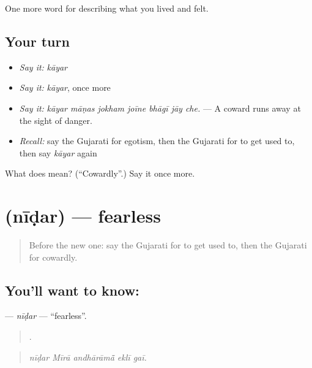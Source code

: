 \begin{grammarlens}[title={What you've built}]
One more word for describing what you lived and felt.
\end{grammarlens}

\subsection*{Your turn}
\begin{itemize}
\raggedright
  \item \emph{Say it:} \emph{kāyar}
  \item \emph{Say it:} \emph{kāyar}, once more
  \item \emph{Say it:} \emph{kāyar māṇas jokham joīne bhāgī jāy che.} — A coward runs away at the sight of danger.
  \item \emph{Recall:} say the Gujarati for egotism, then the Gujarati for to get used to, then say \emph{kāyar} again
\end{itemize}

\begin{tcolorbox}[breakable,colback=teal!4,colframe=teal!35!black,title={Before you move on}]
What does  mean? (\textquotedblleft{}Cowardly\textquotedblright{}.) Say it once more.
\end{tcolorbox}
\section[\texorpdfstring{\gu{નીડર} (nīḍar)}{નીડર (nīḍar)}]{ (nīḍar) — fearless}

\label{lesson:GU-C466-nidar}



\begin{quote}
Before the new one: say the Gujarati for to get used to, then the Gujarati for cowardly.
\end{quote}

\subsection*{You'll want to know: }
\textbf{} — \emph{nīḍar} — \textquotedblleft{}fearless\textquotedblright{}.

\begin{quote}
    .
\end{quote}

\begin{quote}
\emph{nīḍar Mīrā andhārāmā̃ eklī gaī.}
\end{quote}

